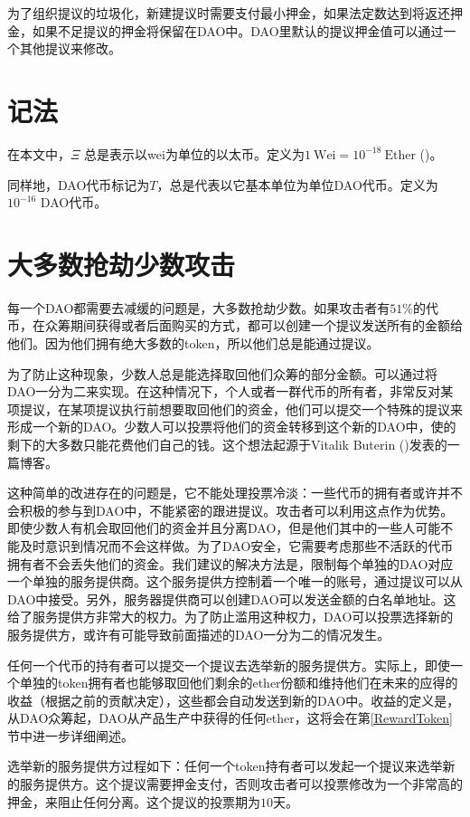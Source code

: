\documentclass[9pt,oneside]{amsart}
\begin{document}
\begin{multicols}{2}
为了组织提议的垃圾化，新建提议时需要支付最小押金，如果法定数达到将返还押金，如果不足提议的押金将保留在DAO中。DAO里默认的提议押金值可以通过一个其他提议来修改。

\section{记法}
在本文中，$\Xi$ 总是表示以wei为单位的以太币。定义为$1 \: \text{Wei} = 10^{-18} \: \text{Ether}$ (\cite{Wood2014ethereum})。

同样地，DAO代币标记为$T$，总是代表以它基本单位为单位DAO代币。定义为$10^{-16}$ DAO代币。

\section{大多数抢劫少数攻击}
每一个DAO都需要去减缓的问题是，大多数抢劫少数。如果攻击者有$51\%$的代币，在众筹期间获得或者后面购买的方式，都可以创建一个提议发送所有的金额给他们。因为他们拥有绝大多数的token，所以他们总是能通过提议。

为了防止这种现象，少数人总是能选择取回他们众筹的部分金额。可以通过将DAO一分为二来实现。在这种情况下，个人或者一群代币的所有者，非常反对某项提议，在某项提议执行前想要取回他们的资金，他们可以提交一个特殊的提议来形成一个新的DAO。少数人可以投票将他们的资金转移到这个新的DAO中，使的剩下的大多数只能花费他们自己的钱。这个想法起源于Vitalik Buterin (\cite{Vitalik2015subjectivity})发表的一篇博客。

这种简单的改进存在的问题是，它不能处理投票冷淡：一些代币的拥有者或许并不会积极的参与到DAO中，不能紧密的跟进提议。攻击者可以利用这点作为优势。即使少数人有机会取回他们的资金并且分离DAO，但是他们其中的一些人可能不能及时意识到情况而不会这样做。为了DAO安全，它需要考虑那些不活跃的代币拥有者不会丢失他们的资金。我们建议的解决方法是，限制每个单独的DAO对应一个单独的服务提供商。这个服务提供方控制着一个唯一的账号，通过提议可以从DAO中接受。另外，服务器提供商可以创建DAO可以发送金额的白名单地址。这给了服务提供方非常大的权力。为了防止滥用这种权力，DAO可以投票选择新的服务提供方，或许有可能导致前面描述的DAO一分为二的情况发生。

任何一个代币的持有者可以提交一个提议去选举新的服务提供方。实际上，即使一个单独的token拥有者也能够取回他们剩余的ether份额和维持他们在未来的应得的收益（根据之前的贡献决定），这些都会自动发送到新的DAO中。收益的定义是，从DAO众筹起，DAO从产品生产中获得的任何ether，这将会在第\ref{RewardToken}节中进一步详细阐述。

选举新的服务提供方过程如下：任何一个token持有者可以发起一个提议来选举新的服务提供方。这个提议需要押金支付，否则攻击者可以投票修改为一个非常高的押金，来阻止任何分离。这个提议的投票期为$10$天。


\end{multicols}
\end{document}
